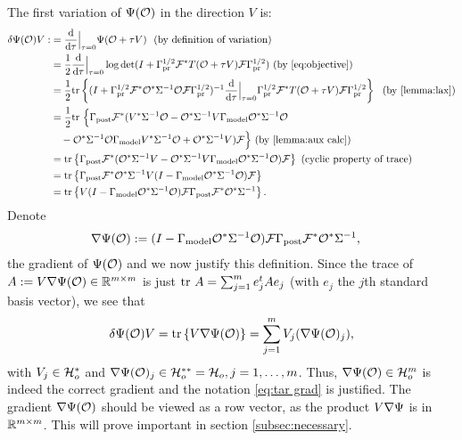 The first variation of $\Psi (\mathcal{O})$ in the direction $V$ is:
\begin{align}\label{eq:tar var}
  \begin{split}
    \delta \tar(\obs) V 
    :&= \frac{\der}{\der\tau} \Big |_{\tau=0} \tar(\obs + \tau V)\  \text{ (by definition of variation)}\\
    &= \frac12 \frac{\der}{\der \tau} \Big |_{\tau=0} \log \det 
    (I + \prcov^{1/2} \fwd^* T(\obs+\tau V)\fwd \prcov^{1/2} ) \text{ (by \eqref{eq:objective})}\\
    &= \frac12 \tr{( I + \prcov^{1/2} \fwd^* \obs^* \Sigma^{-1}
    \obs\fwd \prcov^{1/2} )^{-1}
    \frac{\der}{\der \tau} \Big |_{\tau=0}
    \prcov^{1/2} \fwd^* T(\obs+\tau V) \fwd \prcov^{1/2}}\ \text{ (by \ref{lemma:lax})}\\
    &= \frac12 \ttr\Big \{ \postcov \fwd^* (V^* \Sigma^{-1} \obs 
    - \obs^*\Sigma^{-1} V\modcov \obs^* \Sigma^{-1}\obs \\
    &\ \ \ - \obs^* \Sigma^{-1} \obs \modcov V^* \Sigma^{-1}\obs 
    + \obs^* \Sigma^{-1} V ) \fwd \Big \}  \text{ (by \ref{lemma:aux calc})}\\
    &= \tr{\postcov \fwd^* ( \obs^* \Sigma^{-1} V -
    \obs^*\Sigma^{-1} V\modcov \obs^* \Sigma^{-1}\obs ) \fwd} \text{
        (cyclic property of trace)} \\
    &= \tr{\postcov \fwd^* \obs^* \Sigma^{-1} V 
    ( I - \modcov \obs^* \Sigma^{-1}\obs ) \fwd} \\
    &= \tr{V ( I - \modcov \obs^* \Sigma^{-1}\obs )
    \fwd \postcov \fwd^* \obs^* \Sigma^{-1}}.
  \end{split}
\end{align} 
Denote
\begin{align}\label{eq:tar grad}
  \nabla \tar(\obs) &:= (I - \modcov \obs^* \Sigma^{-1} \obs) \fwd
  \postcov \fwd^* \obs^*\Sigma^{-1},
\end{align}
the gradient of $\Psi (\mathcal{O} )$ and we now justify this definition.
Since the trace of $A := V \nabla \Psi(\mathcal{O}) \in \mathbb{R}^{m \times m}$ is
just $\textup{tr}\ A = \sum_{j=1}^m e_j^t A e_j$ (with $e_j$ the $j$th standard
basis vector), we see that
\begin{align*}
  \delta \tar(\obs)V = \tr{V \nabla \tar(\obs)} = \sum_{j=1}^m
  V_j(\nabla \tar(\obs)_j),
\end{align*}
with $V_j \in \mathcal{H}_o^*$ and $\nabla \Psi(\mathcal{O})_j \in \mathcal{H}_o^{**} =
\mathcal{H}_o, j=1,\dots,m$. Thus, $\nabla \Psi( \mathcal{O} ) \in \mathcal{H}_o^m$ is indeed
the correct gradient and the notation \eqref{eq:tar grad} is
justified. The gradient $\nabla \Psi(\mathcal{O})$ should be viewed as a row
vector, as the product $V \nabla \Psi$ is in $\mathbb{R}^{m \times m}$. This
will prove important in section \ref{subsec:necessary}.


